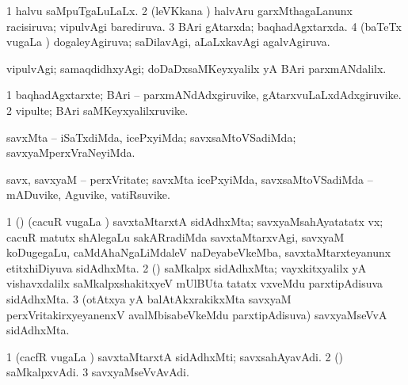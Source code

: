 {{{{{{{{{{{{{\bentry
{} 
\gl{\nA}
\expl{}
\bmng
\emng
\eentry

\bentry
{} 
\gl{\gu}
\expl{}
\bmng
\bnum
\num{1} halvu saMpuTgaLuLaLx. 
\num{2} (leVKkana \vi) halvAru garxMthagaLanunx racisiruva; vipulvAgi barediruva. 
\num{3} BAri gAtarxda; baqhadAgxtarxda. 
\num{4} (baTeTx \mo vugaLa \vi) dogaleyAgiruva; saDilavAgi, aLaLxkavAgi agalvAgiruva. 
\enum
\emng
\eentry

\bentry
{} 
\gl{\kirxvi}
\expl{}
\bmng
vipulvAgi; samaqdidhxyAgi; doDaDxsaMKeyxyalilx yA BAri parxmANdalilx. 
\emng
\eentry

\bentry 
{} 
\gl{\nA}
\expl{}
\bmng
\bnum
\num{1} baqhadAgxtarxte; BAri -- parxmANdAdxgiruvike, gAtarxvuLaLxdAdxgiruvike. 
\num{2} vipulte; BAri saMKeyxyalilxruvike. 
\enum
\emng
\eentry

\bentry
{} 
\gl{\kirxvi}
\expl{}
\bmng
 savxMta -- iSaTxdiMda, icePxyiMda; savxsaMtoVSadiMda; savxyaMperxVraNeyiMda. 
\emng
\eentry

\bentry
{} 
\gl{\nA}
\expl{}
\bmng
 savx, savxyaM -- perxVritate; savxMta icePxyiMda, savxsaMtoVSadiMda -- mADuvike, Aguvike, vatiRsuvike. 
\emng
\eentry

\bentry 
{} 
\gl{\nA}
\expl{}
\bmng
\hypertarget{voluntarism(1)}{} 
\bnum
\num{1} (\ca) (cacuR \mo vugaLa \vi) savxtaMtarxtA sidAdhxMta; savxyaMsahAyatatatx vx; cacuR matutx shAlegaLu sakARradiMda savxtaMtarxvAgi, savxyaM koDugegaLu, caMdAhaNgaLiMdaleV naDeyabeVkeMba, savxtaMtarxteyanunx etitxhiDiyuva sidAdhxMta. 
\num{2} (\tashA) saMkalpx sidAdhxMta; vayxkitxyalilx yA vishavxdalilx saMkalpxshakitxyeV mUlBUta tatatx vxveMdu parxtipAdisuva sidAdhxMta. 
\num{3} (otAtxya yA balAtAkxrakikxMta savxyaM perxVritakirxyeyanenxV avalMbisabeVkeMdu parxtipAdisuva) savxyaMseVvA sidAdhxMta. 
\enum
\emng
\eentry

\bentry
{} 
\gl{\nA}
\expl{}
\bmng
\bnum
\num{1} (cacfR \mo vugaLa \vi) savxtaMtarxtA sidAdhxMti; savxsahAyavAdi. 
\num{2} (\tashA) saMkalpxvAdi. 
\num{3} savxyaMseVvAvAdi. 
\enum
\emng
\eentry

}}}}}}}}}}}}}
